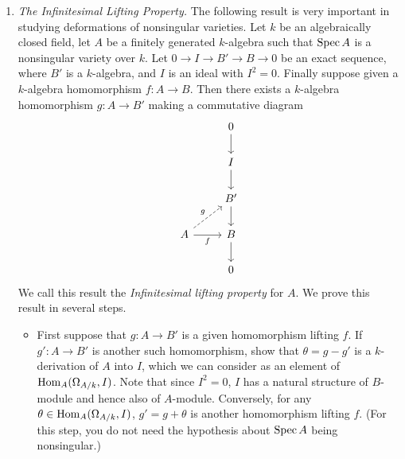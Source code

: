 \documentclass[a4paper]{article}
\begin{document}
\begin{enumerate} [label=\textbf{\arabic*.}, leftmargin=0em]
    \item[\textbf{6.}] \textit{The Infinitesimal Lifting Property.} The following result is very important in studying deformations of nonsingular varieties.
          Let $k$ be an algebraically closed field, let $A$ be a finitely generated $k$-algebra such that $\operatorname{Spec}{A}$ is a nonsingular variety over $k$.
          Let $0 \to I \to B' \to B \to 0$ be an exact sequence, where $B'$ is a $k$-algebra, and $I$ is an ideal with $I^2 = 0$.
          Finally suppose given a $k$-algebra homomorphism $f : A \to B$. Then there exists a $k$-algebra homomorphism $g : A \to B'$ making a commutative diagram
          \[ \begin{tikzcd}
                  & 0 \arrow[d]  \\
                  & I \arrow[d]  \\
                  & B' \arrow[d] \\
                  A \arrow[r, "f"'] \arrow[ru, "g", dashed] & B \arrow[d]  \\
                  & 0
              \end{tikzcd} \]
          We call this result the \textit{Infinitesimal lifting property} for $A$. We prove this result in several steps.
          \begin{itemize}
              \item[(a)] First suppose that $g : A \to B'$ is a given homomorphism lifting $f$. If $g' : A \to B'$ is another such homomorphism, show that $\theta = g - g'$ is a $k$-derivation of $A$ into $I$, which we can consider as an element of $\operatorname{Hom}_A(\Omega_{A / k}, I)$.
                    Note that since $I^2 = 0$, $I$ has a natural structure of $B$-module and hence also of $A$-module.
                    Conversely, for any $\theta \in \operatorname{Hom}_A(\Omega_{A/k}, I)$, $g' = g + \theta$ is another homomorphism lifting $f$.
                    (For this step, you do not need the hypothesis about $\operatorname{Spec}{A}$ being nonsingular.)


\end{itemize}
\end{enumerate}
\end{document}
